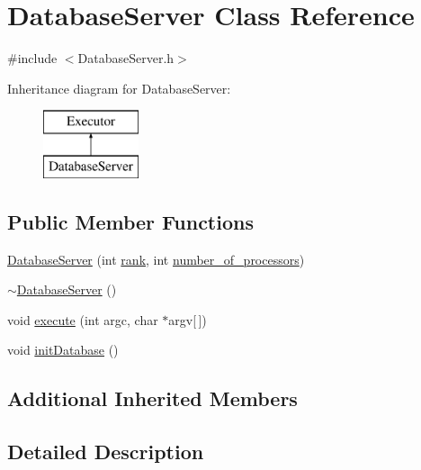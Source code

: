 \hypertarget{class_database_server}{}\section{Database\+Server Class Reference}
\label{class_database_server}


{\ttfamily \#include $<$Database\+Server.\+h$>$}

Inheritance diagram for Database\+Server\+:\begin{figure}[H]
\begin{center}
\leavevmode
\includegraphics[height=2.000000cm]{class_database_server}
\end{center}
\end{figure}
\subsection*{Public Member Functions}
\begin{DoxyCompactItemize}
\item 
\hyperlink{class_database_server_a47a93c980abf65f1e440a6850ee923f9}{Database\+Server} (int \hyperlink{class_executor_a33c24e2887b4d9c4ef7f3566d3bc803e}{rank}, int \hyperlink{class_executor_a4e798bde66d26fe200de7e8d2b54e915}{number\+\_\+of\+\_\+processors})
\item 
\hyperlink{class_database_server_a36ff1397d646b4672e2aec7ccb102044}{$\sim$\+Database\+Server} ()
\item 
void \hyperlink{class_database_server_af476941a81155fd24d88d3e941be935b}{execute} (int argc, char $\ast$argv\mbox{[}$\,$\mbox{]})
\item 
void \hyperlink{class_database_server_a31064a18819c201d37882c74b25f8cf6}{init\+Database} ()
\end{DoxyCompactItemize}
\subsection*{Additional Inherited Members}


\subsection{Detailed Description}


